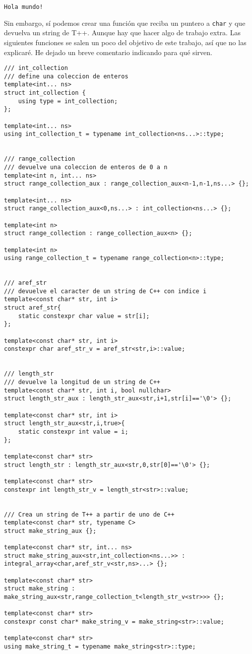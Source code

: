 \documentclass[11pt]{article}
\begin{document}
\begin{verbatim}
Hola mundo!
\end{verbatim}


Sin embargo, sí podemos crear una función que reciba un puntero a \texttt{char} y que devuelva un string de T++. Aunque hay que hacer algo de trabajo extra. Las siguientes funciones se salen un poco del objetivo de este trabajo, así que no las explicaré. He dejado un breve comentario indicando para qué sirven.

\begin{verbatim}
/// int_collection
/// define una coleccion de enteros
template<int... ns>
struct int_collection {
	using type = int_collection;
};

template<int... ns>
using int_collection_t = typename int_collection<ns...>::type;


/// range_collection
/// devuelve una coleccion de enteros de 0 a n
template<int n, int... ns>
struct range_collection_aux : range_collection_aux<n-1,n-1,ns...> {};

template<int... ns>
struct range_collection_aux<0,ns...> : int_collection<ns...> {};

template<int n>
struct range_collection : range_collection_aux<n> {};

template<int n>
using range_collection_t = typename range_collection<n>::type;


/// aref_str
/// devuelve el caracter de un string de C++ con indice i
template<const char* str, int i>
struct aref_str{
	static constexpr char value = str[i];
};

template<const char* str, int i>
constexpr char aref_str_v = aref_str<str,i>::value;


/// length_str
/// devuelve la longitud de un string de C++
template<const char* str, int i, bool nullchar>
struct length_str_aux : length_str_aux<str,i+1,str[i]=='\0'> {};

template<const char* str, int i>
struct length_str_aux<str,i,true>{
	static constexpr int value = i;
};

template<const char* str>
struct length_str : length_str_aux<str,0,str[0]=='\0'> {};

template<const char* str>
constexpr int length_str_v = length_str<str>::value;


/// Crea un string de T++ a partir de uno de C++
template<const char* str, typename C>
struct make_string_aux {};

template<const char* str, int... ns>
struct make_string_aux<str,int_collection<ns...>> : integral_array<char,aref_str_v<str,ns>...> {};

template<const char* str>
struct make_string : make_string_aux<str,range_collection_t<length_str_v<str>>> {};

template<const char* str>
constexpr const char* make_string_v = make_string<str>::value;

template<const char* str>
using make_string_t = typename make_string<str>::type;
\end{verbatim}
\end{document}
